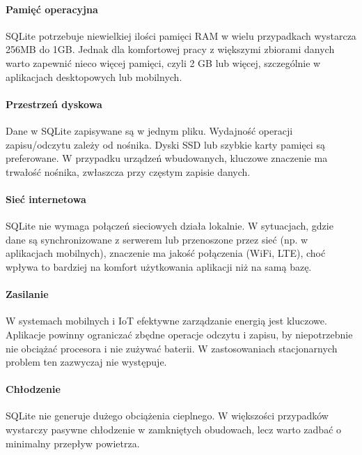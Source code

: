 \documentclass[letterpaper,10pt,polish]{sphinxmanual}
\begin{document}
\paragraph{Pamięć operacyjna}
\label{\detokenize{rozdzial2/Sprzet-dla-bazy-danych/source/SprzetDlaBazyDanych:id2}}
\sphinxAtStartPar
SQLite potrzebuje niewielkiej ilości pamięci RAM w wielu przypadkach wystarcza 256MB do 1GB. Jednak dla komfortowej pracy z większymi zbiorami danych warto zapewnić nieco więcej pamięci, czyli 2 GB lub więcej, szczególnie w aplikacjach desktopowych lub mobilnych.


\paragraph{Przestrzeń dyskowa}
\label{\detokenize{rozdzial2/Sprzet-dla-bazy-danych/source/SprzetDlaBazyDanych:id3}}
\sphinxAtStartPar
Dane w SQLite zapisywane są w jednym pliku. Wydajność operacji zapisu/odczytu zależy od nośnika. Dyski SSD lub szybkie karty pamięci są preferowane. W przypadku urządzeń wbudowanych, kluczowe znaczenie ma trwałość nośnika, zwłaszcza przy częstym zapisie danych.


\paragraph{Sieć internetowa}
\label{\detokenize{rozdzial2/Sprzet-dla-bazy-danych/source/SprzetDlaBazyDanych:id4}}
\sphinxAtStartPar
SQLite nie wymaga połączeń sieciowych \textendash{} działa lokalnie. W sytuacjach, gdzie dane są synchronizowane z serwerem lub przenoszone przez sieć (np. w aplikacjach mobilnych), znaczenie ma jakość połączenia (Wi\sphinxhyphen{}Fi, LTE), choć wpływa to bardziej na komfort użytkowania aplikacji niż na samą bazę.


\paragraph{Zasilanie}
\label{\detokenize{rozdzial2/Sprzet-dla-bazy-danych/source/SprzetDlaBazyDanych:id5}}
\sphinxAtStartPar
W systemach mobilnych i IoT efektywne zarządzanie energią jest kluczowe. Aplikacje powinny ograniczać zbędne operacje odczytu i zapisu, by niepotrzebnie nie obciążać procesora i nie zużywać baterii. W zastosowaniach stacjonarnych problem ten zazwyczaj nie występuje.


\paragraph{Chłodzenie}
\label{\detokenize{rozdzial2/Sprzet-dla-bazy-danych/source/SprzetDlaBazyDanych:id6}}
\sphinxAtStartPar
SQLite nie generuje dużego obciążenia cieplnego. W większości przypadków wystarczy pasywne chłodzenie w zamkniętych obudowach, lecz warto zadbać o minimalny przepływ powietrza.
\end{document}
